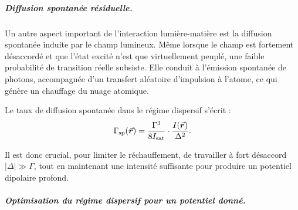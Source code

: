 %

\subparagraph{Diffusion spontanée résiduelle.}

Un autre aspect important de l’interaction lumière-matière est la diffusion spontanée induite par le champ lumineux. Même lorsque le champ est fortement désaccordé et que l’état excité n’est que virtuellement peuplé, une faible probabilité de transition réelle subsiste. Elle conduit à l’émission spontanée de photons, accompagnée d’un transfert aléatoire d’impulsion à l’atome, ce qui génère un chauffage du nuage atomique.

Le taux de diffusion spontanée dans le régime dispersif s’écrit :
\begin{eqnarray}
\Gamma_{\mathrm{sp}}(\vec{{\bm{r}}}) =  \frac{\Gamma^3}{8 I_{\mathrm{sat}}} \cdot \frac{I(\vec{{\bm{r}}})}{\Delta^2}.
\label{eq:GammaSp}
\end{eqnarray}

Il est donc crucial, pour limiter le réchauffement, de travailler à fort désaccord \( |\Delta| \gg \Gamma \), tout en maintenant une intensité suffisante pour produire un potentiel dipolaire profond.


%

\subparagraph{Optimisation du régime dispersif pour un potentiel donné.}


